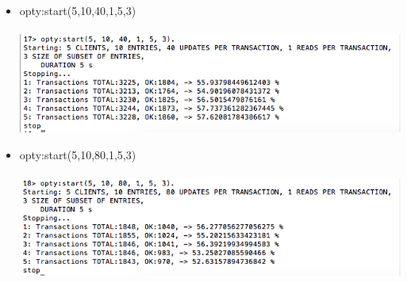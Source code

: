 \documentclass[a4paper, 11pt]{article}
\begin{document}
\begin{itemize}
\item opty:start(5,10,40,1,5,3)\\\\
\includegraphics[scale=0.5]{images/exp-iii-5.png} \\
\item opty:start(5,10,80,1,5,3)\\\\
\includegraphics[scale=0.5]{images/exp-iii-6.png} \\
\end{itemize}
%
\end{document}
